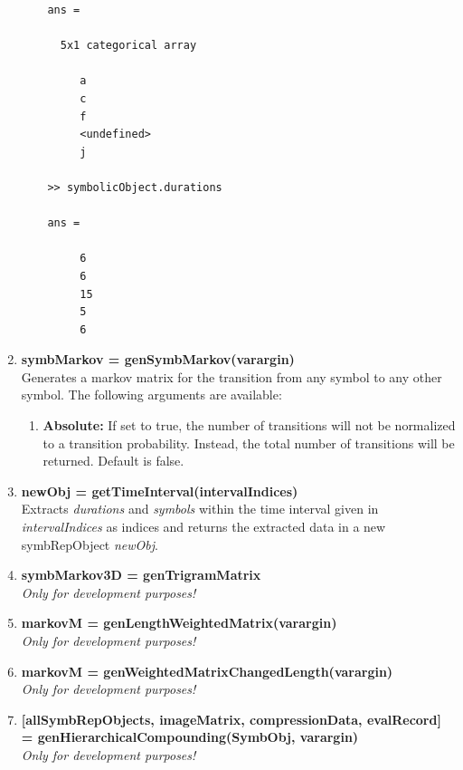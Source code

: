 \documentclass[a4]{scrreprt}
\begin{document}
\begin{enumerate}
\begin{verbatim}
    ans = 
    
      5x1 categorical array
    
         a 
         c 
         f 
         <undefined> 
         j 
    
    >> symbolicObject.durations
    
    ans =
    
         6
         6
         15
         5
         6
    \end{verbatim}
    
    \item \textbf{symbMarkov = genSymbMarkov(varargin)}\\
    Generates a markov matrix for the transition from any symbol to any other symbol. The following arguments are available:
    \begin{enumerate}
    	\item \textbf{Absolute: } If set to true, the number of transitions will not be normalized to a transition probability. Instead, the total number of transitions will be returned. Default is false.
    \end{enumerate}

    \item \textbf{newObj = getTimeInterval(intervalIndices)}\\
	Extracts \textit{durations} and \textit{symbols} within the time interval given in \textit{intervalIndices} as indices and returns the extracted data in a new symbRepObject \textit{newObj}.

	\item \textbf{symbMarkov3D = genTrigramMatrix}\\
	\textit{Only for development purposes!}
	
	\item \textbf{markovM = genLengthWeightedMatrix(varargin)}\\
	\textit{Only for development purposes!}
	
	\item \textbf{markovM = genWeightedMatrixChangedLength(varargin)}\\
	\textit{Only for development purposes!}
	
	\item \textbf{[allSymbRepObjects, imageMatrix, compressionData, evalRecord] = genHierarchicalCompounding(SymbObj, varargin)}\\
	\textit{Only for development purposes!}
	
\end{enumerate}
\end{document}
